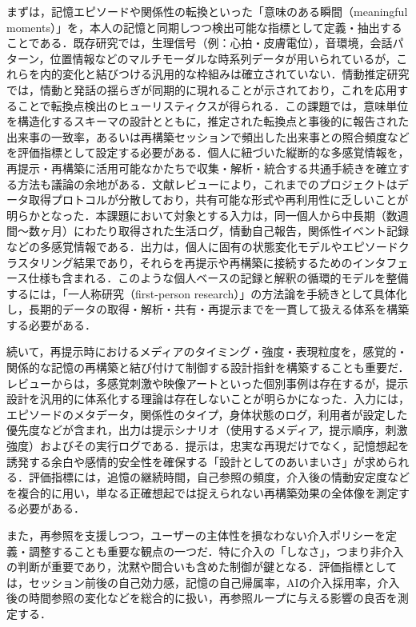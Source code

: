 \documentclass[originalpaper]{jsaiart}
\begin{document}
まずは，記憶エピソードや関係性の転換といった「意味のある瞬間（meaningful moments）」を，本人の記憶と同期しつつ検出可能な指標として定義・抽出することである．既存研究では，生理信号（例：心拍・皮膚電位），音環境，会話パターン，位置情報などのマルチモーダルな時系列データが用いられているが，これらを内的変化と結びつける汎用的な枠組みは確立されていない\cite{ringeval2013,karkar2017}．情動推定研究\cite{douglascowie2008,cowie2011}では，情動と発話の揺らぎが同期的に現れることが示されており，これを応用することで転換点検出のヒューリスティクスが得られる．この課題では，意味単位を構造化するスキーマの設計とともに，推定された転換点と事後的に報告された出来事の一致率，あるいは再構築セッションで頻出した出来事との照合頻度などを評価指標として設定する必要がある．個人に紐づいた縦断的な多感覚情報を，再提示・再構築に活用可能なかたちで収集・解析・統合する共通手続きを確立する方法も議論の余地がある．文献レビューにより，これまでのプロジェクトはデータ取得プロトコルが分散しており，共有可能な形式や再利用性に乏しいことが明らかとなった．本課題において対象とする入力は，同一個人から中長期（数週間〜数ヶ月）にわたり取得された生活ログ，情動自己報告，関係性イベント記録などの多感覚情報である．出力は，個人に固有の状態変化モデルやエピソードクラスタリング結果であり，それらを再提示や再構築に接続するためのインタフェース仕様も含まれる．このような個人ベースの記録と解釈の循環的モデルを整備するには，「一人称研究（first-person research）\cite{suwa2015}」の方法論を手続きとして具体化し，長期的データの取得・解析・共有・再提示までを一貫して扱える体系を構築する必要がある．

続いて，再提示時におけるメディアのタイミング・強度・表現粒度を，感覚的・関係的な記憶の再構築と結び付けて制御する設計指針を構築することも重要だ．レビューからは，多感覚刺激や映像アートといった個別事例は存在するが，提示設計を汎用的に体系化する理論は存在しないことが明らかになった．入力には，エピソードのメタデータ，関係性のタイプ，身体状態のログ，利用者が設定した優先度などが含まれ，出力は提示シナリオ（使用するメディア，提示順序，刺激強度）およびその実行ログである．提示は，忠実な再現だけでなく，記憶想起を誘発する余白や感情的安全性を確保する「設計としてのあいまいさ」が求められる．評価指標には，追憶の継続時間，自己参照の頻度，介入後の情動安定度などを複合的に用い，単なる正確想起では捉えられない再構築効果の全体像を測定する必要がある．

また，再参照を支援しつつ，ユーザーの主体性を損なわない介入ポリシーを定義・調整することも重要な観点の一つだ．特に介入の「しなさ」，つまり非介入の判断が重要であり，沈黙や間合いも含めた制御が鍵となる．評価指標としては，セッション前後の自己効力感，記憶の自己帰属率，AIの介入採用率，介入後の時間参照の変化などを総合的に扱い，再参照ループに与える影響の良否を測定する．
\end{document}
